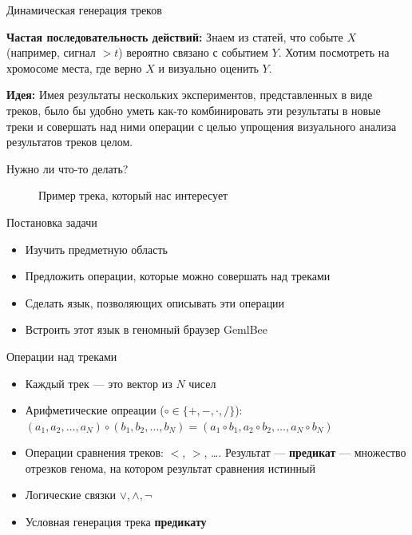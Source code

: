 \begin{frame}{Динамическая генерация треков}

\begin{block}{\textbf{Частая последовательность действий:}}
Знаем из статей, что событе $X$ (например, сигнал $> t$) вероятно связано с событием $Y$. Хотим посмотреть на хромосоме места, где верно $X$ и визуально оценить $Y$.
\end{block}

\begin{block}{\textbf{Идея:}} 
Имея результаты нескольких экспериментов, представленных в виде треков, было бы удобно
уметь как-то комбинировать эти результаты в новые треки и совершать над ними операции с целью упрощения визуального
анализа результатов треков целом.
\end{block}
\end{frame}

\begin{frame}{Нужно ли что-то делать?}
\begin{figure}[ht!]\color{cText}\renewcommand\color[2][]{}
\centering
\def\svgwidth{3.5in}
\textbf{}
\caption{Пример трека, который нас интересует}
\end{figure}
\end{frame}

\begin{frame}{Постановка задачи}
\large{\begin{itemize}
	\item Изучить предметную область
	\item Предложить операции, которые можно совершать над треками
	\item Сделать язык, позволяющих описывать эти операции
	\item Встроить этот язык в геномный браузер GemlBee 
\end{itemize}}
\end{frame}

\begin{frame}{Операции над треками}
\begin{itemize}
	\item Каждый трек --- это вектор из $N$ чисел
	\item Арифметические опреации ($\circ \in \{ +, -, \cdot, / \}$): $(a_1, a_2, \ldots, a_N) \circ (b_1, b_2, \ldots, b_N) = (a_1 \circ b_1, a_2 \circ b_2, \ldots, a_N \circ b_N)$
	\item Операции сравнения треков: $<$, $>$, \ldots. Результат --- \textbf{предикат} --- множество отрезков генома, на котором результат сравнения истинный
	\item Логические связки $\lor, \land, \neg$
	\item Условная генерация трека \textbf{предикату}
\end{itemize}
\end{frame}


